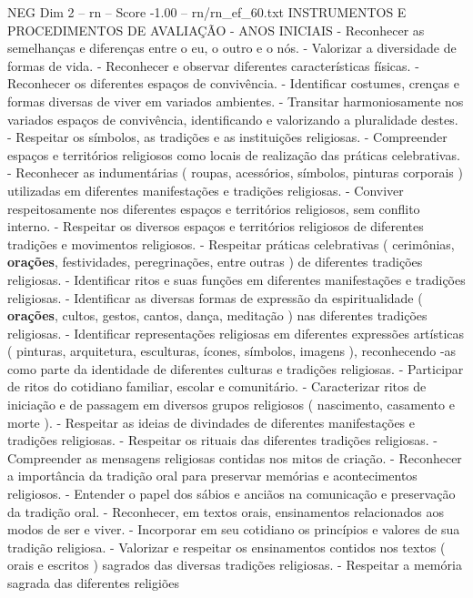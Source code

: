 \begin{textsample}{NEG Dim 2 – rn – Score -1.00 – rn/rn\_ef\_60.txt}  \label{ex:f2_neg_044}
INSTRUMENTOS E PROCEDIMENTOS DE AVALIAÇÃO - ANOS INICIAIS - Reconhecer as semelhanças e diferenças entre o eu, o outro e o nós. - Valorizar a diversidade de formas de vida. - Reconhecer e observar diferentes características físicas. - Reconhecer os diferentes espaços de convivência. - Identificar costumes, crenças e formas diversas de viver em variados ambientes. - Transitar harmoniosamente nos variados espaços de convivência, identificando e valorizando a pluralidade destes. - Respeitar os símbolos, as tradições e as instituições religiosas. - Compreender espaços e territórios religiosos como locais de realização das práticas celebrativas. - Reconhecer as indumentárias ( roupas, acessórios, símbolos, pinturas corporais ) utilizadas em diferentes manifestações e tradições religiosas. - Conviver respeitosamente nos diferentes espaços e territórios religiosos, sem conflito interno. - Respeitar os diversos espaços e territórios religiosos de diferentes tradições e movimentos religiosos. - Respeitar práticas celebrativas ( cerimônias, \textbf{orações}, festividades, peregrinações, entre outras ) de diferentes tradições religiosas. - Identificar ritos e suas funções em diferentes manifestações e tradições religiosas. - Identificar as diversas formas de expressão da espiritualidade ( \textbf{orações}, cultos, gestos, cantos, dança, meditação ) nas diferentes tradições religiosas. - Identificar representações religiosas em diferentes expressões artísticas ( pinturas, arquitetura, esculturas, ícones, símbolos, imagens ), reconhecendo -as como parte da identidade de diferentes culturas e tradições religiosas. - Participar de ritos do cotidiano familiar, escolar e comunitário. - Caracterizar ritos de iniciação e de passagem em diversos grupos religiosos ( nascimento, casamento e morte ). - Respeitar as ideias de divindades de diferentes manifestações e tradições religiosas. - Respeitar os rituais das diferentes tradições religiosas. - Compreender as mensagens religiosas contidas nos mitos de criação. - Reconhecer a importância da tradição oral para preservar memórias e acontecimentos religiosos. - Entender o papel dos sábios e anciãos na comunicação e preservação da tradição oral. - Reconhecer, em textos orais, ensinamentos relacionados aos modos de ser e viver. - Incorporar em seu cotidiano os princípios e valores de sua tradição religiosa. - Valorizar e respeitar os ensinamentos contidos nos textos ( orais e escritos ) sagrados das diversas tradições religiosas. - Respeitar a memória sagrada das diferentes religiões

\end{textsample}
